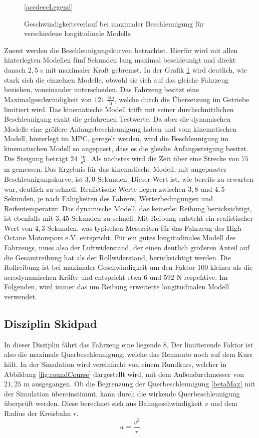 \documentclass{like}
\begin{document}
\begin{figure}
	\centering
	 
	\ref{accdeccLegend}
	\caption{Geschwindigkeitsverlauf bei maximaler Beschleunigung für verschiedene longitudinale Modelle}
	\label{fig:accdec}
\end{figure}
Zuerst werden die Beschleunigungskurven betrachtet. Hierfür wird mit allen hinterlegten Modellen fünf Sekunden lang maximal beschleunigt und direkt danach $2,5$ s mit maximaler Kraft gebremst.
In der Grafik \ref{fig:accdec} wird deutlich, wie stark sich die einzelnen Modelle, obwohl sie sich auf das gleiche Fahrzeug beziehen, voneinander unterscheiden. Das Fahrzeug besitzt eine Maximalgeschwindigkeit von $121$  $\frac{\text{km}}{\text{h}}$, welche durch die Übersetzung im Getriebe limitiert wird. Das kinematische Modell trifft mit seiner durchschnittlichen Beschleunigung exakt die gefahrenen Testwerte. Da aber die dynamischen Modelle eine größere Anfangsbeschleunigung haben und vom kinematischen Modell, hinterlegt im \ac{MPC}, geregelt werden, wird die Beschleunigung im kinematischen Modell so angepasst, dass es die gleiche Anfangssteigung besitzt. Die Steigung beträgt $24$ $ \frac{\text{m}}{\text{s\textsuperscript{2}}}$. 
Als nächstes wird die Zeit über eine Strecke von $75$ m gemessen. Das Ergebnis für das kinematische Modell, mit angepasster Beschleunigungskurve, ist $3,0$ Sekunden. Dieser Wert ist, wie bereits zu erwarten war, deutlich zu schnell. Realistische Werte liegen zwischen $3,8$ und $4,5$ Sekunden, je nach Fähigkeiten des Fahrers, Wetterbedingungen und Reifentemperatur. Das dynamische Modell, das keinerlei Reibung berücksichtigt, ist ebenfalls mit $3,45$ Sekunden zu schnell. Mit Reibung entsteht ein realistischer Wert von $4,3$ Sekunden, was typischen Messzeiten für das Fahrzeug des High-Octane Motorspors e.V. entspricht. Für ein gutes longitudinales Modell des Fahrzeugs, muss also der Luftwiderstand, der einen deutlich größeren Anteil auf die Gesamtreibung hat als der Rollwiderstand, berücksichtigt werden. Die Rollreibung ist bei maximaler Geschwindigkeit um den Faktor 100 kleiner als die aerodynamischen Kräfte und entspricht etwa 6 und 592 N respektive. Im Folgenden, wird immer das um Reibung erweiterte longitudinalen Modell verwendet.


\subsection{Disziplin Skidpad}
In dieser Disziplin fährt das Fahrzeug eine liegende 8. Der limitierende Faktor ist also die maximale Querbeschleunigung, welche das Rennauto noch auf dem Kurs hält. In der Simulation wird vereinfacht von einem Rundkurs, welcher in Abbildung \ref{fig:roundCourse} dargestellt wird, mit dem Außendurchmesser von $21,25$ m ausgegangen. Ob die Begrenzung der Querbeschleunigung \ref{betaMax} mit der Simulation übereinstimmt, kann durch die wirkende Querbeschleunigung überprüft werden.
Diese berechnet sich aus Bahngeschwindigkeit $v$ und dem Radius der Kreisbahn $r$. 
\begin{equation}
	a = \frac{v^2}{r}
\end{equation}
\end{document}
